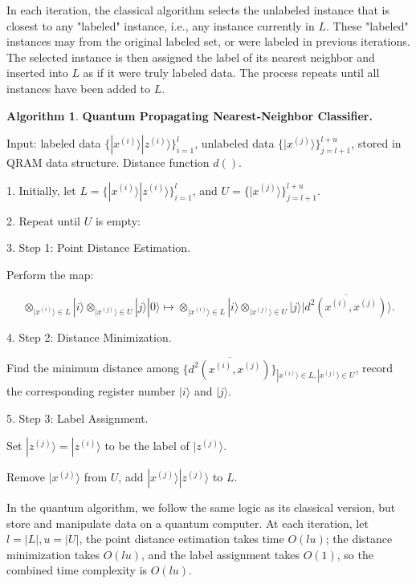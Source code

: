 \documentclass[11pt]{article}
\theoremstyle{definition}
\newtheorem{algorithm}{Algorithm}[section]
\def\zsi{z^{(i)}}
\def\zsj{z^{(j)}}
\def\xsi{x^{(i)}}
\def\xsj{x^{(j)}}
\begin{document}
In each iteration, the classical algorithm selects the unlabeled instance that is closest to any "labeled" instance, i.e., any instance currently in $L$. These "labeled" instances may from the original labeled set, or were labeled in previous iterations. The selected instance is then assigned the label of its nearest neighbor and inserted into $L$ as if it were truly labeled data. The process repeats until all instances have been added to $L$.



\begin{algorithm}
\textbf{Quantum Propagating Nearest-Neighbor Classifier.}

Input: labeled data $\{ |\xsi\rangle |\zsi\rangle \}_{i = 1}^l$, unlabeled data $\{ |\xsj\rangle \}_{j = l+1}^{l + u}$, stored in QRAM data structure. Distance function $d()$.

1. Initially, let $L = \{ |\xsi\rangle |\zsi\rangle \}_{i = 1}^l $, and $U = \{ |\xsj\rangle \}_{j = l+1}^{l + u}$. 

2. Repeat until $U$ is empty:

3. Step 1: Point Distance Estimation.

Perform the map:

\begin{equation*}
   \otimes_{|\xsi\rangle \in L} |i\rangle \otimes_{|\xsj\rangle \in U} |j\rangle |0\rangle
   \mapsto \otimes_{|\xsi\rangle \in L} |i\rangle \otimes_{|\xsj\rangle \in U} |j\rangle |\overline{d^2(\xsi, \xsj)}\rangle.
\end{equation*}

4. Step 2: Distance Minimization.

Find the minimum distance among $\{\overline{d^2(\xsi, \xsj)}\}_{|\xsi\rangle \in L, |\xsj\rangle \in U}$, record the corresponding register number $|i\rangle$ and $|j\rangle$.

5. Step 3: Label Assignment.

Set $|\zsj\rangle = |\zsi\rangle $ to be the label of $|\zsj\rangle$.


Remove $|\xsj\rangle$ from $U$, add $|\xsj\rangle |\zsj\rangle $ to $L$.

\end{algorithm}

In the quantum algorithm, we follow the same logic as its classical version, but store and manipulate data on a quantum computer. At each iteration, let $l = |L|, u = |U|$, the point distance estimation takes time $O (l u)$; the distance minimization takes $O (l u)$, and the label assignment takes $O(1)$, so the combined time complexity is $O (l u)$.
\end{document}
